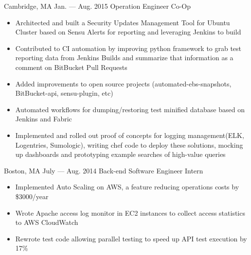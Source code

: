 \documentclass{resume}
\begin{document}
\smallskip
\begin{body}
	{Cambridge, MA}
	{Jan. --- Aug. 2015}
	{Operation Engineer Co-Op}
	\begin{itemize}[noitemsep,topsep=0pt]
		\item Architected and built a Security Updates Management Tool for Ubuntu Cluster based on Sensu Alerts for reporting and leveraging Jenkins to build
		\item Contributed to CI automation by improving python framework to grab test reporting data from Jenkins Builds and summarize that information as a comment on BitBucket Pull Requests
		\item Added improvements to open source projects (automated-ebs-snapshots, BitBucket-api, sensu-plugin, etc)
		\item Automated workflows for dumping/restoring test minified database based on Jenkins and Fabric
		\item Implemented and rolled out proof of concepts for logging management(ELK, Logentries, Sumologic), writing chef code to deploy these solutions, mocking up dashboards and prototyping example searches of high-value queries
	\end{itemize}
\end{body}

\smallskip
\begin{body}
	{Boston, MA}
	{July --- Aug. 2014}
	{Back-end Software Engineer Intern}
	\begin{itemize}[noitemsep,topsep=0pt]
		\item Implemented Auto Scaling on AWS, a feature reducing operations costs by \$3000/year
		\item Wrote Apache access log monitor in EC2 instances to collect access statistics to AWS CloudWatch
		\item Rewrote test code allowing parallel testing to speed up API test execution by 17\%
	\end{itemize}
\end{body}

\smallskip
\end{document}
